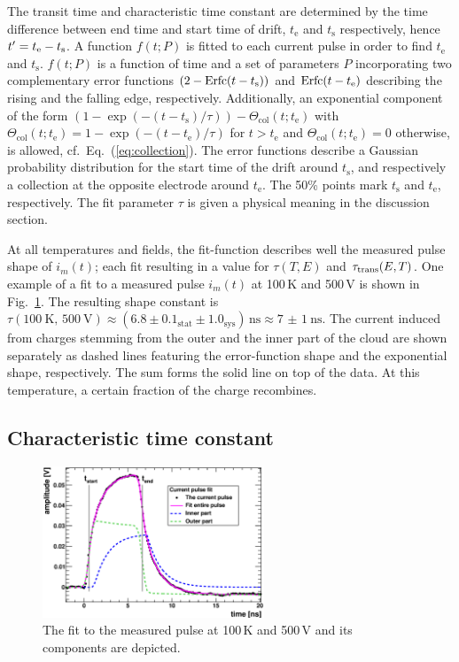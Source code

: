 The transit time and characteristic time constant are determined by the time difference between end time and start time of drift,
 $t_{\text{e}}$ and $t_{\text{s}}$ respectively, hence $\mathnormal{t'} = t_{\text{e}} - t_{\text{s}}$.
A function $f(t;P)$ is fitted to each current pulse in order to find $t_{\text{e}}$ and $t_{\text{s}}$.
$f(t;P)$ is a function of time and a set of parameters $P$ incorporating two complementary error functions $(2-\operatorname{{\textrm{Erfc}}}(t-t_{\text{s}}))$ and $\operatorname{{\textrm{Erfc}}}(t-t_{\text{e}})$
 describing the rising and the falling edge, respectively. 
Additionally, an exponential component  of the form $\left( 1-\exp \left(-(t-t_{\text{s}})/\tau\right) \right) - \Theta_{\textrm{col}}(t;t_{\text{e}})$ with
  $\Theta_{\textrm{col}}(t;t_{\text{e}}) = 1 - \exp \left( -(t-t_{\text{e}})/\tau \right)$ for $t > t_{\text{e}}$ and $\Theta_{\textrm{col}}(t;t_{\text{e}}) = 0$ otherwise,
 is allowed, cf.~Eq.~(\ref{eq:collection}). 
The error functions describe a Gaussian probability distribution for the start time of the drift around $t_{\text{s}}$,
 and respectively a collection at the opposite electrode around $t_{\text{e}}$. 
The 50\% points mark $t_{\text{s}}$ and $t_{\text{e}}$, respectively. 
The fit parameter $\tau$ is given a physical meaning in the discussion section. 

At all temperatures and fields, the fit-function describes well the measured pulse shape of $i_m(t)$;
 each fit resulting in a value for $\tau(T,E)$ and $\tau_\textrm{trans}(E,T)$.
One example of a fit to a measured pulse $i_m(t)$ at 100\,K and 500\,V is shown in Fig.~\ref{fig:ExModel2}. 
The resulting shape constant is $\tau(\SI{100}{\kelvin},\,\SI{500}{\volt}) \approx (\num{6.8}\pm\num{0.1}_{\textrm{stat}}\pm\num{1.0}_{\textrm{sys}})\,\si{\ns} \approx \SI{7(1)}{\ns}$. 
The current induced from charges stemming from the outer and the inner part of the cloud are shown separately as dashed lines
 featuring the error-function shape and the exponential shape, respectively.
The sum forms the solid line on top of the data. 
At this temperature, a certain fraction of the charge recombines. 

\subsection{Characteristic time constant}

\begin{figure}[t]
 \centering
 \includegraphics[width=0.59\textwidth]{figures/ex_pulsefit3}%
 \caption{The fit to the measured pulse at 100\,K and 500\,V and its components are depicted.}
 \label{fig:ExModel2}
\end{figure}


